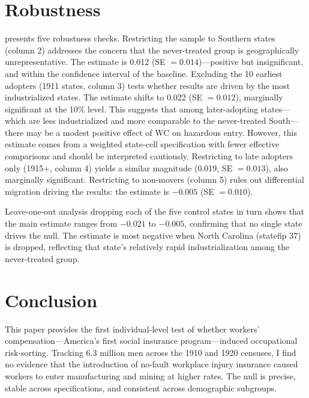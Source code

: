 \documentclass[12pt]{article}
\begin{document}



\section{Robustness}\label{sec:robustness}

 presents five robustness checks. Restricting the sample to Southern states (column 2) addresses the concern that the never-treated group is geographically unrepresentative. The estimate is 0.012 (SE $= 0.014$)---positive but insignificant, and within the confidence interval of the baseline. Excluding the 10 earliest adopters (1911 states, column 3) tests whether results are driven by the most industrialized states. The estimate shifts to 0.022 (SE $= 0.012$), marginally significant at the 10\% level. This suggests that among later-adopting states---which are less industrialized and more comparable to the never-treated South---there may be a modest positive effect of WC on hazardous entry. However, this estimate comes from a weighted state-cell specification with fewer effective comparisons and should be interpreted cautiously. Restricting to late adopters only (1915+, column 4) yields a similar magnitude (0.019, SE $= 0.013$), also marginally significant. Restricting to non-movers (column 5) rules out differential migration driving the results: the estimate is $-0.005$ (SE $= 0.010$).

Leave-one-out analysis dropping each of the five control states in turn shows that the main estimate ranges from $-0.021$ to $-0.005$, confirming that no single state drives the null. The estimate is most negative when North Carolina (statefip 37) is dropped, reflecting that state's relatively rapid industrialization among the never-treated group.




\section{Conclusion}\label{sec:conclusion}

This paper provides the first individual-level test of whether workers' compensation---America's first social insurance program---induced occupational risk-sorting. Tracking 6.3 million men across the 1910 and 1920 censuses, I find no evidence that the introduction of no-fault workplace injury insurance caused workers to enter manufacturing and mining at higher rates. The null is precise, stable across specifications, and consistent across demographic subgroups.
\end{document}
